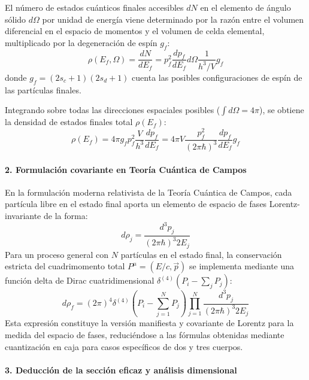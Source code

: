 El número de estados cuánticos finales accesibles $dN$ en el elemento de ángulo sólido $d\Omega$ por unidad de energía viene determinado por la razón entre el volumen diferencial en el espacio de momentos y el volumen de celda elemental, multiplicado por la degeneración de espín $g_f$:
\begin{equation}
\rho(E_f, \Omega) = \frac{dN}{dE_f} = p_f^2 \frac{dp_f}{dE_f} d\Omega \frac{1}{h^3 / V} g_f
\end{equation}
donde $g_f = (2s_c + 1)(2s_d + 1)$ cuenta las posibles configuraciones de espín de las partículas finales.

Integrando sobre todas las direcciones espaciales posibles ($\int d\Omega = 4\pi$), se obtiene la densidad de estados finales total $\rho(E_f)$:
\begin{equation}
\rho(E_f) = 4\pi g_f p_f^2 \frac{V}{h^3} \frac{dp_f}{dE_f} = 4\pi V \frac{p_f^2}{(2\pi\hbar)^3} \frac{dp_f}{dE_f} g_f
\end{equation}

\paragraph{2. Formulación covariante en Teoría Cuántica de Campos}

En la formulación moderna relativista de la Teoría Cuántica de Campos, cada partícula libre en el estado final aporta un elemento de espacio de fases Lorentz-invariante de la forma:
\begin{equation}
d\rho_j = \frac{d^3p_j}{(2\pi\hbar)^3 2E_j}
\end{equation}
Para un proceso general con $N$ partículas en el estado final, la conservación estricta del cuadrimomento total $P^\mu = (E/c, \vec{p})$ se implementa mediante una función delta de Dirac cuatridimensional $\delta^{(4)}(P_i - \sum_j P_j)$:
\begin{equation}
d\rho_f = (2\pi)^4 \delta^{(4)}\left(P_i - \sum_{j=1}^N P_j\right) \prod_{j=1}^N \frac{d^3p_j}{(2\pi\hbar)^3 2E_j}
\end{equation}
Esta expresión constituye la versión manifiesta y covariante de Lorentz para la medida del espacio de fases, reduciéndose a las fórmulas obtenidas mediante cuantización en caja para casos específicos de dos y tres cuerpos.

\paragraph{3. Deducción de la sección eficaz y análisis dimensional}

